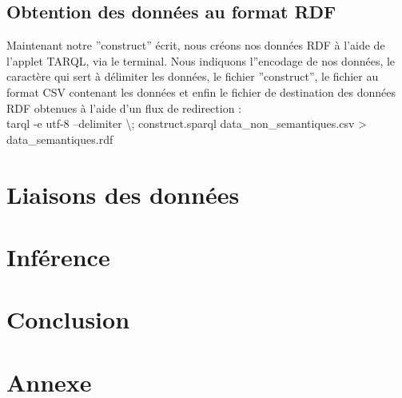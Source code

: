\documentclass[a4paper,sffamily,12pt]{article}
\begin{document}
			\vspace{0.5cm}
			
		\subsection{Obtention des données au format RDF}
			
			\vspace{0.5cm}
	
			Maintenant notre ''construct'' écrit, nous créons nos données RDF à l'aide de l'applet TARQL, via le terminal. Nous indiquons l''encodage de nos données, le caractère qui sert à délimiter les données, le fichier ''construct'', le fichier au format CSV contenant les données et enfin le fichier de destination des données RDF obtenues à l'aide d'un flux de redirection : \\
			tarql -e utf-8 --delimiter \textbackslash; construct.sparql data\_non\_semantiques.csv > data\_semantiques.rdf

			\vspace{0.5cm}

	\section{Liaisons des données}

		\vspace{0.5cm}
		
		
		
		\vspace{0.5cm}			

	\section{Inférence}

		\vspace{0.5cm}
		
		
		
		\vspace{0.5cm}
				
	\section{Conclusion}

		\vspace{0.5cm}			



		\newpage			
		
	\section{Annexe}

		\vspace{0.5cm}
		
		
								
\end{document}
